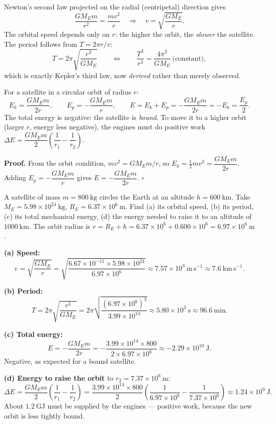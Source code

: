 \documentclass[11pt]{article}
\begin{document}
Newton's second law projected on the radial (centripetal) direction gives
\[
\frac{GM_E m}{r^{2}} = \frac{mv^{2}}{r}
\quad\Longrightarrow\quad
\boxed{v = \sqrt{\frac{GM_E}{r}}}.
\]
The orbital speed depends only on $r$: the higher the orbit, the \emph{slower} the satellite. The period follows from $T = 2\pi r / v$:
\[
\boxed{T = 2\pi\sqrt{\frac{r^{3}}{GM_E}}}
\qquad\Longleftrightarrow\qquad
\frac{T^{2}}{r^{3}} = \frac{4\pi^{2}}{GM_E} \ \text{(constant)},
\]
which is exactly Kepler's third law, now \emph{derived} rather than merely observed.

\begin{propriete}
For a satellite in a circular orbit of radius $r$:
\[
E_k = \frac{GM_E m}{2r}, \qquad
E_p = -\frac{GM_E m}{r}, \qquad
\boxed{E = E_k + E_p = -\frac{GM_E m}{2r} = -E_k = \frac{E_p}{2}}.
\]
The total energy is negative: the satellite is \emph{bound}. To move it to a higher orbit (larger $r$, energy less negative), the engines must do positive work $\Delta E = \dfrac{GM_E m}{2}\left(\dfrac{1}{r_1} - \dfrac{1}{r_2}\right)$.
\end{propriete}

\textbf{Proof.} From the orbit condition, $mv^{2} = GM_E m/r$, so $E_k = \tfrac{1}{2}mv^{2} = \dfrac{GM_E m}{2r}$. Adding $E_p = -\dfrac{GM_E m}{r}$ gives $E = -\dfrac{GM_E m}{2r}$. $\square$

\begin{exoresolu}
A satellite of mass $m = 800\ \mathrm{kg}$ circles the Earth at an altitude $h = 600\ \mathrm{km}$. Take $M_E = 5.98\times 10^{24}\ \mathrm{kg}$, $R_E = 6.37\times 10^{6}\ \mathrm{m}$. Find (a) its orbital speed, (b) its period, (c) its total mechanical energy, (d) the energy needed to raise it to an altitude of $1000\ \mathrm{km}$.
\tcblower
The orbit radius is $r = R_E + h = 6.37\times 10^{6} + 0.600\times 10^{6} = 6.97\times 10^{6}\ \mathrm{m}$.

\textbf{(a) Speed:}
\[
v = \sqrt{\frac{GM_E}{r}} = \sqrt{\frac{6.67\times 10^{-11}\times 5.98\times 10^{24}}{6.97\times 10^{6}}} \approx 7.57\times 10^{3}\ \mathrm{m\,s^{-1}} \approx 7.6\ \mathrm{km\,s^{-1}}.
\]

\textbf{(b) Period:}
\[
T = 2\pi\sqrt{\frac{r^{3}}{GM_E}} = 2\pi\sqrt{\frac{(6.97\times 10^{6})^{3}}{3.99\times 10^{14}}} \approx 5.80\times 10^{3}\ \mathrm{s} \approx 96.6\ \mathrm{min}.
\]

\textbf{(c) Total energy:}
\[
E = -\frac{GM_E m}{2r} = -\frac{3.99\times 10^{14}\times 800}{2\times 6.97\times 10^{6}} \approx -2.29\times 10^{10}\ \mathrm{J}.
\]
Negative, as expected for a bound satellite.

\textbf{(d) Energy to raise the orbit} to $r_2 = 7.37\times 10^{6}\ \mathrm{m}$:
\[
\Delta E = \frac{GM_E m}{2}\left(\frac{1}{r_1} - \frac{1}{r_2}\right)
= \frac{3.99\times 10^{14}\times 800}{2}\left(\frac{1}{6.97\times 10^{6}} - \frac{1}{7.37\times 10^{6}}\right)
\approx 1.24\times 10^{9}\ \mathrm{J}.
\]
About $1.2\ \mathrm{GJ}$ must be supplied by the engines — positive work, because the new orbit is less tightly bound.
\end{exoresolu}
\end{document}
